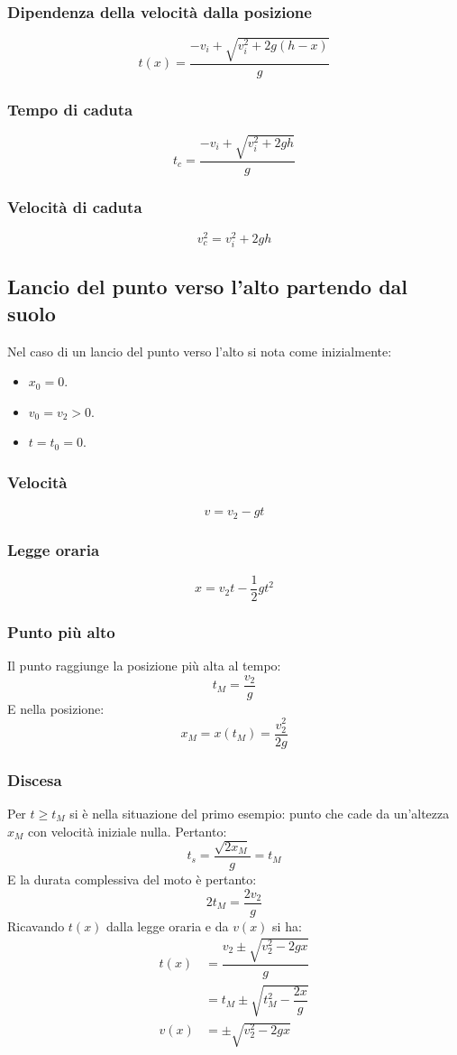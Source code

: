 \documentclass[class=book, crop=false, oneside, 12pt]{standalone}
\begin{document}
		\subsubsection{Dipendenza della velocit\`a dalla posizione}
		$$t(x) = \dfrac{-v_i+\sqrt{v_i^2+2g(h-x)}}{g}$$
		\subsubsection{Tempo di caduta}
		$$t_c = \dfrac{-v_i+\sqrt{v_i^2+2gh}}{g}$$
		\subsubsection{Velocit\`a di caduta}
		$$v_c^2=v_i^2+2gh$$
	\subsection{Lancio del punto verso l'alto partendo dal suolo}
	Nel caso di un lancio del punto verso l'alto si nota come inizialmente:
	\begin{multicols}{3}
		\begin{itemize}
			\item $x_0=0$.
			\item $v_0 = v_2 > 0$.
			\item $t=t_0=0$.
		\end{itemize}
	\end{multicols}
		\subsubsection{Velocit\`a}
		$$v=v_2 - gt$$
		\subsubsection{Legge oraria}
		$$x = v_2t-\dfrac{1}{2}gt^2$$
		\subsubsection{Punto pi\`u alto}
		Il punto raggiunge la posizione pi\`u alta al tempo:
		$$t_M = \dfrac{v_2}{g}$$
		E nella posizione:
		$$x_M=x(t_M)=\dfrac{v_2^2}{2g}$$
		\subsubsection{Discesa}
		Per $t\ge t_M$ si \`e nella situazione del primo esempio: punto che cade da un'altezza $x_M$ con velocit\`a iniziale nulla.
		Pertanto:
		$$t_s = \frac{\sqrt{2x_M}}{g}=t_M$$
		E la durata complessiva del moto \`e pertanto:
		$$2t_M = \dfrac{2v_2}{g}$$
		Ricavando $t(x)$ dalla legge oraria e da $v(x)$ si ha:
		\begin{align*}
			t(x) &= \dfrac{v_2\pm \sqrt{v_2^2 - 2gx}}{g}\\
			     &= t_M \pm \sqrt{t_M^2 - \dfrac{2x}{g}}\\
			v(x) &= \pm \sqrt{v_2^2 - 2gx}
		\end{align*}
\end{document}

